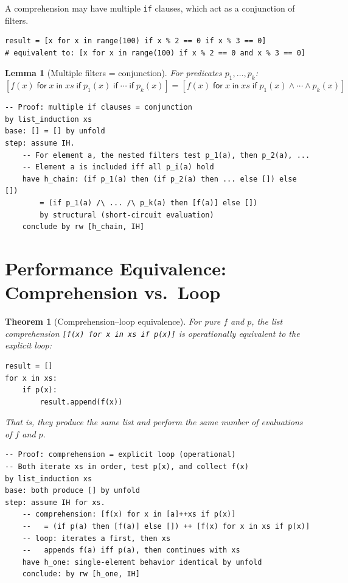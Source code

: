 \documentclass[11pt,a4paper]{report}
\theoremstyle{definition}
\theoremstyle{plain}
\newtheorem{theorem}[definition]{Theorem}
\newtheorem{lemma}[definition]{Lemma}
\begin{document}
A comprehension may have multiple \texttt{if} clauses, which act as a
conjunction of filters.

\begin{lstlisting}[style=python]
result = [x for x in range(100) if x % 2 == 0 if x % 3 == 0]
# equivalent to: [x for x in range(100) if x % 2 == 0 and x % 3 == 0]
\end{lstlisting}

\begin{lemma}[Multiple filters = conjunction]
\label{lem:multi-filter}
For predicates $p_1, \ldots, p_k$:
\[
  [f(x) \;\mathsf{for}\; x \;\mathsf{in}\; \mathit{xs}
    \;\mathsf{if}\; p_1(x) \;\mathsf{if}\; \cdots \;\mathsf{if}\; p_k(x)]
  = [f(x) \;\mathsf{for}\; x \;\mathsf{in}\; \mathit{xs}
    \;\mathsf{if}\; p_1(x) \wedge \cdots \wedge p_k(x)]
\]
\end{lemma}

\begin{lstlisting}[style=proof]
-- Proof: multiple if clauses = conjunction
by list_induction xs
base: [] = [] by unfold
step: assume IH.
    -- For element a, the nested filters test p_1(a), then p_2(a), ...
    -- Element a is included iff all p_i(a) hold
    have h_chain: (if p_1(a) then (if p_2(a) then ... else []) else [])
        = (if p_1(a) /\ ... /\ p_k(a) then [f(a)] else [])
        by structural (short-circuit evaluation)
    conclude by rw [h_chain, IH]
\end{lstlisting}

\section{Performance Equivalence: Comprehension vs.\ Loop}

\begin{theorem}[Comprehension--loop equivalence]
For pure $f$ and $p$, the list comprehension
\lstinline[style=python]|[f(x) for x in xs if p(x)]|
is operationally equivalent to the explicit loop:
\begin{lstlisting}[style=python]
result = []
for x in xs:
    if p(x):
        result.append(f(x))
\end{lstlisting}
That is, they produce the same list and perform the same number of
evaluations of $f$ and $p$.
\end{theorem}

\begin{lstlisting}[style=proof]
-- Proof: comprehension = explicit loop (operational)
-- Both iterate xs in order, test p(x), and collect f(x)
by list_induction xs
base: both produce [] by unfold
step: assume IH for xs.
    -- comprehension: [f(x) for x in [a]++xs if p(x)]
    --   = (if p(a) then [f(a)] else []) ++ [f(x) for x in xs if p(x)]
    -- loop: iterates a first, then xs
    --   appends f(a) iff p(a), then continues with xs
    have h_one: single-element behavior identical by unfold
    conclude: by rw [h_one, IH]
\end{lstlisting}
\end{document}
